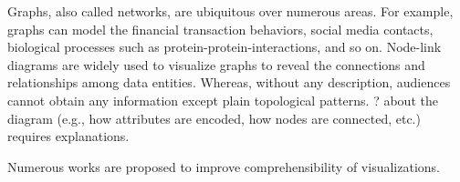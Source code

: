 \maketitle

Graphs, also called networks, are ubiquitous over numerous areas. For example, graphs can model the financial transaction behaviors, social media contacts, biological processes such as protein-protein-interactions, and so on.
Node-link diagrams are widely used to visualize graphs to reveal the connections and relationships among data entities.
Whereas, without any description, audiences cannot obtain any information except plain topological patterns.
{\color{red}{Basic questions}?} about the diagram (e.g., how attributes are encoded, how nodes are connected, etc.) requires explanations.

Numerous works are proposed to improve comprehensibility of visualizations.






